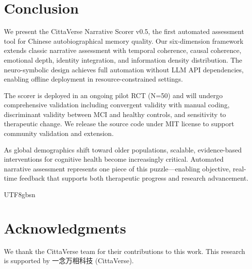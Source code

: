 \documentclass[11pt]{article}
\begin{document}

\section{Conclusion}\label{sec:conclusion}

We present the CittaVerse Narrative Scorer v0.5, the first automated assessment tool for Chinese autobiographical memory quality. Our six-dimension framework extends classic narrative assessment with temporal coherence, causal coherence, emotional depth, identity integration, and information density distribution. The neuro-symbolic design achieves full automation without LLM API dependencies, enabling offline deployment in resource-constrained settings.

The scorer is deployed in an ongoing pilot RCT (N=50) and will undergo comprehensive validation including convergent validity with manual coding, discriminant validity between MCI and healthy controls, and sensitivity to therapeutic change. We release the source code under MIT license to support community validation and extension.

As global demographics shift toward older populations, scalable, evidence-based interventions for cognitive health become increasingly critical. Automated narrative assessment represents one piece of this puzzle---enabling objective, real-time feedback that supports both therapeutic progress and research advancement.


\begin{CJK}{UTF8}{gbsn}
\section*{Acknowledgments}
We thank the CittaVerse team for their contributions to this work. This research is supported by 一念万相科技 (CittaVerse).
\end{CJK}




\end{document}
